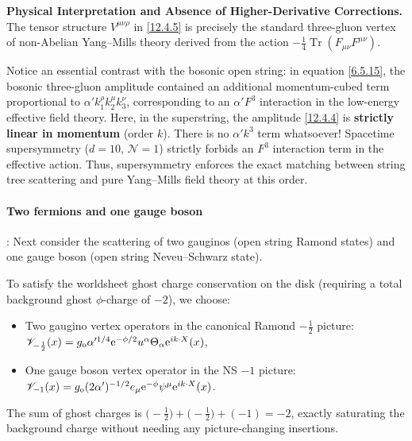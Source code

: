 \begin{tcolorbox}[breakable]
	\begin{remark}
		\textbf{Physical Interpretation and Absence of Higher-Derivative Corrections.}
		The tensor structure $V^{\mu\nu\rho}$ in \eqref{12.4.5} is precisely the standard three-gluon vertex of non-Abelian Yang--Mills theory derived from the action $-\frac{1}{4}\operatorname{Tr}(F_{\mu\nu}F^{\mu\nu})$. 
		
		Notice an essential contrast with the bosonic open string: in equation \eqref{6.5.15}, the bosonic three-gluon amplitude contained an additional momentum-cubed term proportional to $\alpha' k_{1}^{\rho}k_{2}^{\mu}k_{3}^{\nu}$, corresponding to an $\alpha' F^{3}$ interaction in the low-energy effective field theory. Here, in the superstring, the amplitude \eqref{12.4.4} is \textbf{strictly linear in momentum} (order $k$). There is no $\alpha' k^{3}$ term whatsoever! Spacetime supersymmetry ($d=10$, $\mathcal{N}=1$) strictly forbids an $F^{3}$ interaction term in the effective action. Thus, supersymmetry enforces the exact matching between string tree scattering and pure Yang--Mills field theory at this order.
	\end{remark}
\end{tcolorbox}

\paragraph*{Two fermions and one gauge boson}: Next consider the scattering of two gauginos (open string Ramond states) and one gauge boson (open string Neveu--Schwarz state). 

To satisfy the worldsheet ghost charge conservation on the disk (requiring a total background ghost $\phi$-charge of $-2$), we choose:
\begin{itemize}
	\item Two gaugino vertex operators in the canonical Ramond $-\frac{1}{2}$ picture: $\mathscr{V}_{-\frac{1}{2}}(x) = g_{\mathrm{o}}\alpha'^{1/4}\mathrm{e}^{-\phi/2}u^{\alpha}\Theta_{\alpha}\mathrm{e}^{i k\cdot X}(x)$,
	\item One gauge boson vertex operator in the NS $-1$ picture: $\mathscr{V}_{-1}(x) = g_{\mathrm{o}}(2\alpha')^{-1/2}e_{\mu}\mathrm{e}^{-\phi}\psi^{\mu}\mathrm{e}^{i k\cdot X}(x)$.
\end{itemize}
The sum of ghost charges is $\bigl(-\frac{1}{2}\bigr) + \bigl(-\frac{1}{2}\bigr) + (-1) = -2$, exactly saturating the background charge without needing any picture-changing insertions.

